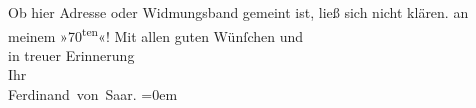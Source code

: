 \begin{ledgroupsized}[t]{13cm}
{{{                  Ob hier Adresse oder Widmungsband gemeint ist, ließ sich nicht klären.}}}\label{K_L01240_1h} an
               meinem »70\textsuperscript{ten}«!\pend
           \pstart
           Mit allen guten Wünſchen und{\\[\baselineskip]}in treuer Erinnerung{\\[\baselineskip]}Ihr{\\[\baselineskip]}\spacefill\mbox{Ferdinand von Saar.}\pend
           \leftskip=0em{}          \endnumbering{}\end{ledgroupsized}  \newcommand{\dateiname}{L01240}\newcommand{\titel}{Ferdinand von Saar an Arthur Schnitzler, 11. 10. 1902}\newcommand{\editorInnen}{Martin Anton Müller und Gerd-Hermann Susen}
            \footnotesize
\begin{ledgroupsized}[t]{11.5cm}
\end{ledgroupsized}
         
      